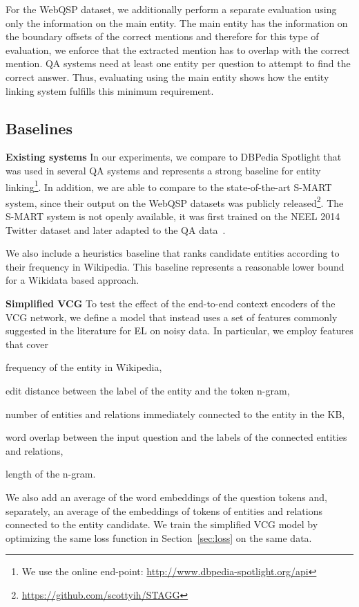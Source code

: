 \documentclass[11pt,a4paper]{article}
\begin{document}
For the WebQSP dataset, we additionally perform a separate evaluation using only the information on the main entity. The main entity has the information on the boundary offsets of the correct mentions and therefore for this type of evaluation, we enforce that the extracted mention has to overlap with the correct mention. QA systems need at least one entity per question to attempt to find the correct answer. Thus, evaluating using the main entity shows how the entity linking system fulfills this minimum requirement.

\subsection{Baselines}

\textbf{Existing systems}
In our experiments, we compare to DBPedia Spotlight that was used in several QA systems and represents a strong baseline for entity linking\footnote{We use the online end-point: \url{http://www.dbpedia-spotlight.org/api}}. In addition, we are able to compare to the state-of-the-art S-MART system, since their output on the WebQSP datasets was publicly released\footnote{\url{https://github.com/scottyih/STAGG}}. The S-MART system is not openly available, it was first trained on the NEEL 2014 Twitter dataset and later adapted to the QA data~\citep{Yih2015}. 

We also include a heuristics baseline that ranks candidate entities according to their frequency in Wikipedia. This baseline represents a reasonable lower bound for a Wikidata based approach.

\textbf{Simplified VCG}
To test the effect of the end-to-end context encoders of the VCG network, we define a model that instead uses a set of features commonly suggested in the literature for EL on noisy data. In particular, we employ features that cover 
\begin{enumerate*}[label=(\arabic*)]
  \item frequency of the entity in Wikipedia,
  \item edit distance between the label of the entity and the token n-gram,
  \item number of entities and relations immediately connected to the entity in the KB,
  \item word overlap between the input question and the labels of the connected entities and relations,
  \item length of the n-gram.
\end{enumerate*}
We also add an average of the word embeddings of the question tokens and, separately, an average of the embeddings of tokens of entities and relations connected to the entity candidate. We train the simplified VCG model by optimizing the same loss function in Section~\ref{sec:loss} on the same data.
\end{document}
